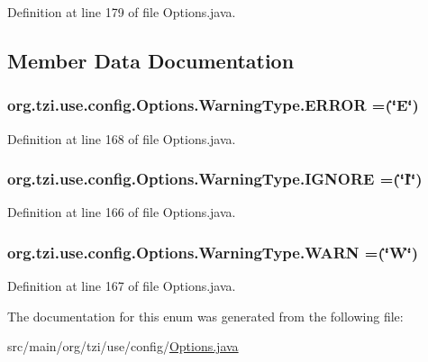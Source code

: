 Definition at line 179 of file Options.\-java.



\subsection{Member Data Documentation}
\hypertarget{enumorg_1_1tzi_1_1use_1_1config_1_1_options_1_1_warning_type_ae40f94103b133dc3d459da742237a7b5}{
\subsubsection[{E\-R\-R\-O\-R}]{\setlength{\rightskip}{0pt plus 5cm}org.\-tzi.\-use.\-config.\-Options.\-Warning\-Type.\-E\-R\-R\-O\-R =(\char`\"{}E\char`\"{})}}\label{enumorg_1_1tzi_1_1use_1_1config_1_1_options_1_1_warning_type_ae40f94103b133dc3d459da742237a7b5}


Definition at line 168 of file Options.\-java.

\hypertarget{enumorg_1_1tzi_1_1use_1_1config_1_1_options_1_1_warning_type_ac029cecc7bcdee7bc6d64d42da6ce6e6}{
\subsubsection[{I\-G\-N\-O\-R\-E}]{\setlength{\rightskip}{0pt plus 5cm}org.\-tzi.\-use.\-config.\-Options.\-Warning\-Type.\-I\-G\-N\-O\-R\-E =(\char`\"{}I\char`\"{})}}\label{enumorg_1_1tzi_1_1use_1_1config_1_1_options_1_1_warning_type_ac029cecc7bcdee7bc6d64d42da6ce6e6}


Definition at line 166 of file Options.\-java.

\hypertarget{enumorg_1_1tzi_1_1use_1_1config_1_1_options_1_1_warning_type_a4dadbc79ae4c5d373f84f26a09f7a335}{
\subsubsection[{W\-A\-R\-N}]{\setlength{\rightskip}{0pt plus 5cm}org.\-tzi.\-use.\-config.\-Options.\-Warning\-Type.\-W\-A\-R\-N =(\char`\"{}W\char`\"{})}}\label{enumorg_1_1tzi_1_1use_1_1config_1_1_options_1_1_warning_type_a4dadbc79ae4c5d373f84f26a09f7a335}


Definition at line 167 of file Options.\-java.



The documentation for this enum was generated from the following file\-:\begin{DoxyCompactItemize}
\item 
src/main/org/tzi/use/config/\hyperlink{_options_8java}{Options.\-java}\end{DoxyCompactItemize}

